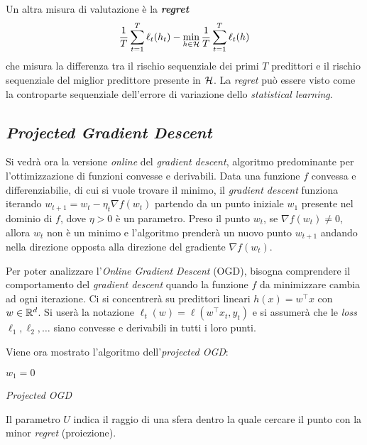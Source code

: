 Un altra misura di valutazione è la \textbf{\textit{regret}}
$$
\frac{1}{T}\sum_{t=1}^{T}\ell_t(h_t)-
\min_{h\in\mathcal{H}}\frac{1}{T}\sum_{t=1}^{T}\ell_t(h)
$$
che misura la differenza tra il rischio sequenziale dei primi $T$ predittori
e il rischio sequenziale del miglior predittore presente in $\mathcal{H}$. La
\textit{regret} può essere visto come la controparte sequenziale dell'errore
di variazione dello \textit{statistical learning}.

\subsection{\textit{Projected Gradient Descent}}
Si vedrà ora la versione \textit{online} del \textit{gradient descent},
algoritmo predominante per l'ottimizzazione di funzioni convesse e derivabili.
Data una funzione $f$ convessa e differenziabilie, di cui si vuole trovare il 
minimo, il \textit{gradient descent} funziona iterando 
$w_{t+1}=w_t-\eta_t\nabla f(w_t)$ partendo da un punto iniziale $w_1$ presente
nel dominio di $f$, dove $\eta>0$ è un parametro. Preso il punto $w_t$, se
$\nabla f(w_t)\neq 0$, allora $w_t$ non è un minimo e l'algoritmo prenderà
un nuovo punto $w_{t+1}$ andando nella direzione opposta alla direzione del
gradiente $\nabla f(w_t)$.

Per poter analizzare l'\textit{Online Gradient Descent} (OGD), bisogna
comprendere il comportamento del \textit{gradient descent} quando la funzione
$f$ da minimizzare cambia ad ogni iterazione. Ci si concentrerà su predittori
lineari $h(x)=w^\top x$ con $w\in\mathbb{R}^d$. Si userà la notazione
$\ell_t(w) = \ell(w^\top x_t,y_t)$ e si assumerà che le \textit{loss}
$\ell_1,\ell_2,\dots$ siano convesse e derivabili in tutti i loro punti.

Viene ora mostrato l'algoritmo dell'\textit{projected OGD}:

\begin{algorithm}[H]
    \DontPrintSemicolon
    \;
    $w_1 = 0\qquad$ \hspace{9.6em}\;
    \caption{\textit{Projected OGD}}
\end{algorithm}
Il parametro $U$ indica il raggio di una sfera dentro la quale cercare il
punto con la minor \textit{regret} (proiezione).

